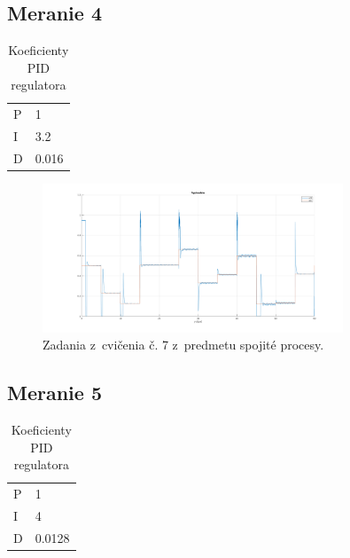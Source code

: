 \documentclass{article}
\begin{document}
\clearpage

\subsection{Meranie 4}
\label{sec:meranie4}

\begin{table}[!htbp]
	\caption{Koeficienty PID regulatora}
	\label{tab:t4}
	\begin{center}
		\begin{tabular}[c]{|l|l|}
			\hline
			P & 1 \\
			I & 3.2 \\
			D & 0.016 \\
			\hline
		\end{tabular}
	\end{center}
\end{table}

\begin{figure}[!htbp]
	\begin{center}
		\includegraphics[width=0.8\textwidth]{./include/m6.png}
	\end{center}
	\caption{Zadania z~cvičenia č. 7 z~predmetu spojité procesy.}
	\label{fig:meranie4}
\end{figure}

\clearpage

\subsection{Meranie 5}
\label{sec:meranie5}

\begin{table}[!htbp]
	\caption{Koeficienty PID regulatora}
	\label{tab:t5}
	\begin{center}
		\begin{tabular}[c]{|l|l|}
			\hline
			P & 1 \\
			I & 4 \\
			D & 0.0128 \\
			\hline
		\end{tabular}
	\end{center}
\end{table}
\end{document}
